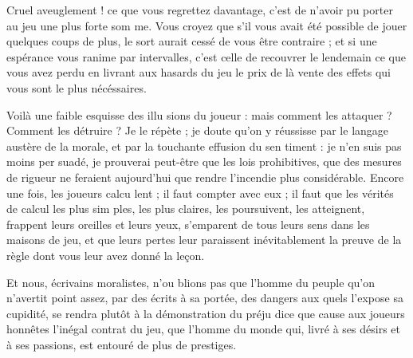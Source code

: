 Cruel aveuglement ! ce que vous
regrettez davantage, c'est de n'avoir
pu porter au jeu une plus forte som%
me. Vous croyez que s'il vous avait
été possible de jouer quelques coups
de plus, le sort aurait cessé de vous
être contraire ;  et si une espérance
vous ranime par intervalles, c'est
celle de recouvrer le lendemain ce
que vous avez perdu en livrant aux
hasards du jeu le prix de là vente des
effets qui vous sont le plus nécéssaires.

Voilà une faible esquisse des illu%
sions du joueur : mais comment les
attaquer ? Comment les détruire ? Je
le répète ; je doute qu'on y réussisse
par le langage austère de la morale,
et par la touchante effusion du sen%
timent : je n'en suis pas moins per%
suadé, je prouverai peut-être que les
lois prohibitives, que des mesures de
rigueur ne feraient aujourd'hui que
rendre l'incendie plus considérable.
Encore une fois, les joueurs calcu%
lent ; il faut compter avec eux ; il faut
que les vérités de calcul les plus sim%
ples, les plus claires, les poursuivent,
les atteignent, frappent leurs oreilles
et leurs yeux, s'emparent de tous
leurs sens dans les maisons de jeu,
et que leurs pertes leur paraissent
inévitablement la preuve de la règle
dont vous leur avez donné la leçon.

Et nous, écrivains moralistes, n'ou%
blions pas que l'homme du peuple
qu'on n'avertit point assez, par des
écrits à sa portée, des dangers aux%
quels l'expose sa cupidité, se rendra
plutôt à la démonstration du préju%
dice que cause aux joueurs honnêtes
l'inégal contrat du jeu, que l'homme
du monde qui, livré à ses désirs et
à ses passions, est entouré de plus de
prestiges.
